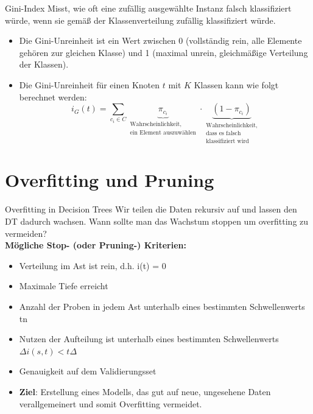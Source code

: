 \documentclass{beamer}
\begin{document}
\begin{frame}{Gini-Index}
Misst, wie oft eine zufällig ausgewählte Instanz falsch klassifiziert würde, wenn sie gemäß der Klassenverteilung zufällig klassifiziert würde.

\begin{itemize}
    \item Die Gini-Unreinheit ist ein Wert zwischen 0 (vollständig rein, alle Elemente gehören zur gleichen Klasse) und 1 (maximal unrein, gleichmäßige Verteilung der Klassen).
    \item Die Gini-Unreinheit für einen Knoten $t$ mit $K$ Klassen kann wie folgt berechnet werden:
    \[
    i_G (t) = \sum_{c_i \in C} \underbrace{\pi_{c_i}}_{\substack{\text{Wahrscheinlichkeit,} \\ \text{ein Element auszuwählen}}} \cdot \underbrace{(1 - \pi_{c_i})}_{\substack{\text{Wahrscheinlichkeit,} \\ \text{dass es falsch} \\ \text{klassifiziert wird}}}
    \]
\end{itemize}
\end{frame}


\section{Overfitting und Pruning}

\begin{frame}{Overfitting in Decision Trees}
Wir teilen die Daten rekursiv auf und lassen den DT dadurch wachsen. Wann sollte man das Wachstum stoppen um overfitting zu vermeiden?\\
\textbf{Mögliche Stop- (oder Pruning-) Kriterien:}
\begin{itemize}
\item Verteilung im Ast ist rein, d.h. i(t) = 0
\item Maximale Tiefe erreicht
\item Anzahl der Proben in jedem Ast unterhalb eines bestimmten Schwellenwerts tn
\item Nutzen der Aufteilung ist unterhalb eines bestimmten Schwellenwerts $\Delta i(s,t) < t\Delta$
\item Genauigkeit auf dem Validierungsset
\item {\textbf{Ziel}: Erstellung eines Modells, das gut auf neue, ungesehene Daten verallgemeinert und somit Overfitting vermeidet.}
\end{itemize}
\end{frame}
\end{document}

